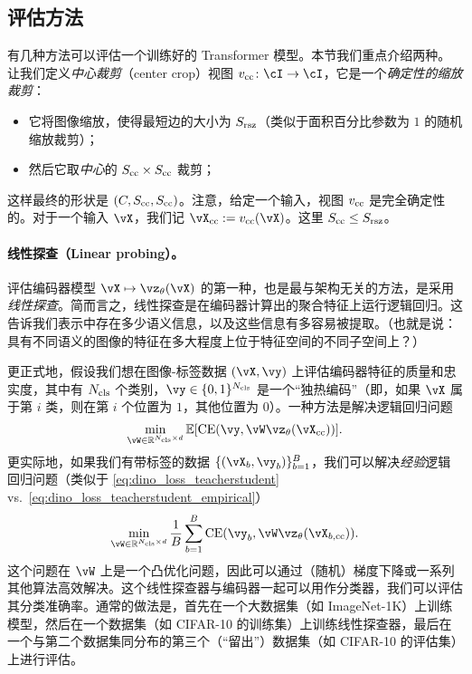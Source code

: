 \documentclass[../../book-main.tex]{subfiles}
\begin{document}
\subsection{评估方法}\label{sub:contrastive_learning_evals}
有几种方法可以评估一个训练好的 Transformer 模型。本节我们重点介绍两种。让我们定义\textit{中心裁剪}（center crop）视图 \(v_{\cc} \colon \cI \to \cI\)，它是一个\textit{确定性的缩放裁剪}：
\begin{itemize}
    \item 它将图像缩放，使得最短边的大小为 \(S_{\mathrm{rsz}}\)（类似于面积百分比参数为 \(1\) 的随机缩放裁剪）；
    \item 然后它取\textit{中心}的 \(S_{\mathrm{cc}} \times S_{\mathrm{cc}}\) 裁剪；
\end{itemize}
这样最终的形状是 \((C, S_{\mathrm{cc}}, S_{\mathrm{cc}})\)。注意，给定一个输入，视图 \(v_{\mathrm{cc}}\) 是完全确定性的。对于一个输入 \(\vX\)，我们记 \(\vX_{\cc} := v_{\cc}(\vX)\)。这里 \(S_{\mathrm{cc}} \leq S_{\mathrm{rsz}}\)。


\paragraph{线性探查（Linear probing）。}

评估编码器模型 \(\vX \mapsto \vz_{\theta}(\vX)\) 的第一种，也是最与架构无关的方法，是采用\textit{线性探查}。简而言之，线性探查是在编码器计算出的聚合特征上运行逻辑回归。这告诉我们表示中存在多少语义信息，以及这些信息有多容易被提取。（也就是说：具有不同语义的图像的特征在多大程度上位于特征空间的不同子空间上？）

更正式地，假设我们想在图像-标签数据 \((\vX, \vy)\) 上评估编码器特征的质量和忠实度，其中有 \(N_{\mathrm{cls}}\) 个类别，\(\vy \in \{0, 1\}^{N_{\cls}}\) 是一个“独热编码”（即，如果 \(\vX\) 属于第 \(i\) 类，则在第 \(i\) 个位置为 \(1\)，其他位置为 \(0\)）。一种方法是解决逻辑回归问题
\begin{equation}\label{eq:linear_probing}
    \min_{\vW \in \R^{N_{\cls} \times d}}\Ex[\CE(\vy, \vW \vz_{\theta}(\vX_{\cc}))].
\end{equation}
更实际地，如果我们有带标签的数据 \(\{(\vX_{b}, \vy_{b})\}_{b = 1}^{B}\)，我们可以解决\textit{经验}逻辑回归问题（类似于 \eqref{eq:dino_loss_teacherstudent} vs.~\eqref{eq:dino_loss_teacherstudent_empirical}）
\begin{equation}\label{eq:linear_probing_empirical}
    \min_{\vW \in \R^{N_{\cls} \times d}}\frac{1}{B}\sum_{b = 1}^{B}\CE(\vy_{b}, \vW \vz_{\theta}(\vX_{b, \cc})).
\end{equation}
这个问题在 \(\vW\) 上是一个凸优化问题，因此可以通过（随机）梯度下降或一系列其他算法高效解决。这个线性探查器与编码器一起可以用作分类器，我们可以评估其分类准确率。通常的做法是，首先在一个大数据集（如 ImageNet-1K）上训练模型，然后在一个数据集（如 CIFAR-10 的训练集）上训练线性探查器，最后在一个与第二个数据集同分布的第三个（“留出”）数据集（如 CIFAR-10 的评估集）上进行评估。
\end{document}
